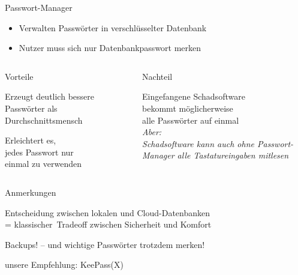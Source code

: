 \begin{frame}{Passwort-Manager}
  \begin{itemize}
    \item Verwalten Passwörter in verschlüsselter Datenbank
    \item Nutzer muss sich nur Datenbankpasswort merken
  \end{itemize}

  \begin{columns}[T]
    \begin{column}{.45\textwidth}
      \pause
      \begin{blit}{Vorteile}
        \small
        \item Erzeugt deutlich bessere Passwörter als Durchschnittsmensch
        \item Erleichtert es,\\jedes Passwort nur\\einmal zu verwenden
      \end{blit}
    \end{column}
    \begin{column}{.55\textwidth}
      \pause
      \begin{blit}{Nachteil}
        \small
        \item Eingefangene Schadsoftware\\bekommt möglicherweise\\alle Passwörter auf einmal\\
          \emph{Aber:\\ Schadsoftware kann auch ohne Passwort-Manager alle Tastatureingaben mitlesen}
      \end{blit}
    \end{column}
  \end{columns}
  \pause
  \begin{blit}{Anmerkungen}
    \small
    \item Entscheidung zwischen lokalen und \glqq Cloud\grqq -Datenbanken\\ = \glqq klassischer\grqq\ Tradeoff zwischen Sicherheit und Komfort
    \item Backups! -- und wichtige Passwörter trotzdem merken!
    \item unsere Empfehlung: KeePass(X)
  \end{blit}
\end{frame}

\endinput
